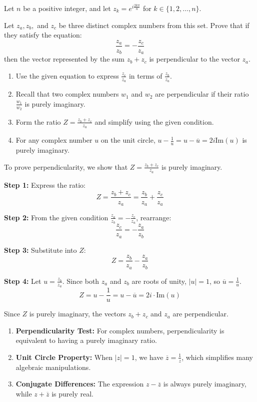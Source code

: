 \begin{problem}
Let $n$ be a positive integer, and let $z_k = e^{i\frac{2k\pi}{n}}$ for $k \in \{1, 2, \dots, n\}$.

Let $z_a, z_b,$ and $z_c$ be three distinct complex numbers from this set. Prove that if they satisfy the equation:
\[
\frac{z_a}{z_b} = - \frac{z_c}{z_a}
\]
then the vector represented by the sum $z_b + z_c$ is perpendicular to the vector $z_a$.
\end{problem}

\begin{hint}
\begin{enumerate}
    \item Use the given equation to express $\frac{z_c}{z_a}$ in terms of $\frac{z_b}{z_a}$.
    \item Recall that two complex numbers $w_1$ and $w_2$ are perpendicular if their ratio $\frac{w_1}{w_2}$ is purely imaginary.
    \item Form the ratio $Z = \frac{z_b + z_c}{z_a}$ and simplify using the given condition.
    \item For any complex number $u$ on the unit circle, $u - \frac{1}{u} = u - \overline{u} = 2i\text{Im}(u)$ is purely imaginary.
\end{enumerate}
\end{hint}

\begin{solution}
To prove perpendicularity, we show that $Z = \frac{z_b + z_c}{z_a}$ is purely imaginary.

\textbf{Step 1:} Express the ratio:
\[
Z = \frac{z_b + z_c}{z_a} = \frac{z_b}{z_a} + \frac{z_c}{z_a}
\]

\textbf{Step 2:} From the given condition $\frac{z_a}{z_b} = -\frac{z_c}{z_a}$, rearrange:
\[
\frac{z_c}{z_a} = -\frac{z_a}{z_b}
\]

\textbf{Step 3:} Substitute into $Z$:
\[
Z = \frac{z_b}{z_a} - \frac{z_a}{z_b}
\]

\textbf{Step 4:} Let $u = \frac{z_b}{z_a}$. Since both $z_a$ and $z_b$ are roots of unity, $|u|=1$, so $\overline{u} = \frac{1}{u}$.
\[
Z = u - \frac{1}{u} = u - \overline{u} = 2i \cdot \text{Im}(u)
\]

Since $Z$ is purely imaginary, the vectors $z_b + z_c$ and $z_a$ are perpendicular.
\end{solution}

\begin{takeaways}
\begin{enumerate}
    \item \textbf{Perpendicularity Test:} For complex numbers, perpendicularity is equivalent to having a purely imaginary ratio.
    \item \textbf{Unit Circle Property:} When $|z|=1$, we have $\overline{z} = \frac{1}{z}$, which simplifies many algebraic manipulations.
    \item \textbf{Conjugate Differences:} The expression $z - \overline{z}$ is always purely imaginary, while $z + \overline{z}$ is purely real.
\end{enumerate}
\end{takeaways}

